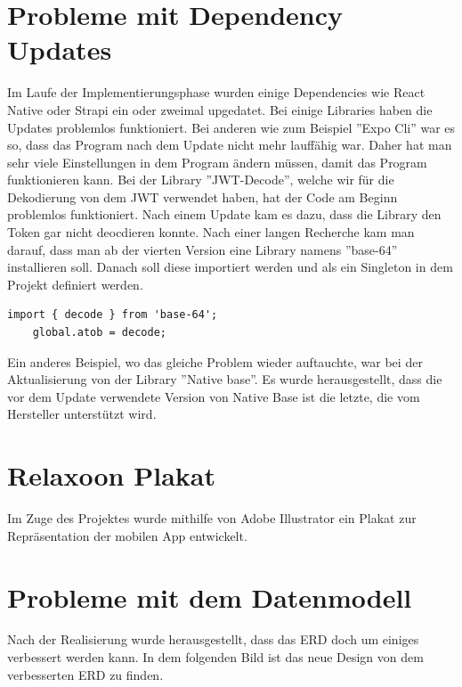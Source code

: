 \begin{spacing}{1}
\begin{quotation}
    \end{quotation}

    \section{Probleme mit Dependency Updates}

    Im Laufe der Implementierungsphase wurden einige Dependencies wie React Native oder Strapi ein oder zweimal upgedatet. Bei einige Libraries haben die Updates problemlos funktioniert. Bei anderen wie zum Beispiel ''Expo Cli'' war es so, dass das Program nach dem Update nicht mehr lauffähig war. Daher hat man sehr viele Einstellungen in dem Program ändern müssen, damit das Program funktionieren kann.
    Bei der Library ''JWT-Decode'', welche wir für die Dekodierung von dem JWT verwendet haben, hat der Code am Beginn problemlos funktioniert. Nach einem Update kam es dazu, dass die Library den Token gar nicht deocdieren konnte.
    Nach einer langen Recherche kam man darauf, dass man ab der vierten Version eine Library namens ''base-64'' installieren soll.
    Danach soll diese importiert werden und als ein Singleton in dem Projekt definiert werden.
    \begin{lstlisting}[caption=base-64 als Singleton]
    import { decode } from 'base-64';
    global.atob = decode;
    \end{lstlisting}
    \begin{quotation}
        \cite{jwt-decode-bug}

    \end{quotation}
    Ein anderes Beispiel, wo das gleiche Problem wieder auftauchte, war bei der Aktualisierung von der Library ''Native base''. Es wurde herausgestellt,
    dass die vor dem Update verwendete Version von Native Base ist die letzte, die vom Hersteller unterstützt wird.

    \section{Relaxoon Plakat}\label{sec:plakat}

    Im Zuge des Projektes wurde mithilfe von Adobe Illustrator ein Plakat zur Repräsentation der mobilen App
    entwickelt.

    \section{Probleme mit dem Datenmodell}
    Nach der Realisierung wurde herausgestellt, dass das ERD doch um einiges verbessert werden kann. In dem folgenden Bild ist das neue Design von dem verbesserten ERD zu finden.


\end{spacing}
